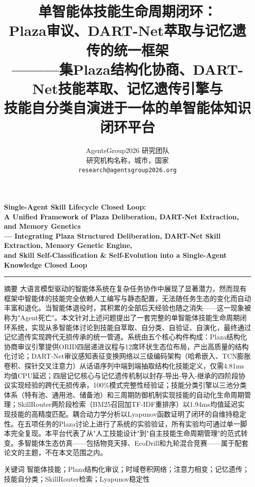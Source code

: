 \documentclass[12pt,a4paper]{ctexart}
\title{\zihao{2}\heiti 单智能体技能生命周期闭环：\\Plaza审议、DART-Net萃取与记忆遗传的统一框架\\
        \vspace{6pt}
        {\zihao{4}\heiti ———集Plaza结构化协商、DART-Net技能萃取、记忆遗传引擎与\\技能自分类自演进于一体的单智能体知识闭环平台}}
\author{
  \zihao{4} AgentsGroup2026 研究团队 \\[4pt]
  \zihao{-5} 研究机构名称，城市，国家 \\[2pt]
  \zihao{-5} \texttt{research@agentsgroup2026.org}
}
\date{}
\begin{document}
\maketitle

\begin{center}
  {\bfseries Single-Agent Skill Lifecycle Closed Loop:\\[2pt]
  A Unified Framework of Plaza Deliberation, DART-Net Extraction, and Memory Genetics\\[4pt]
  \kaishu --- Integrating Plaza Structured Deliberation, DART-Net Skill Extraction, Memory Genetic Engine,\\
  and Skill Self-Classification \& Self-Evolution into a Single-Agent Knowledge Closed Loop}
\end{center}

\vspace{12pt}
\hrule
\vspace{12pt}

{\heiti{} 摘\quad 要\quad}
{\kaishu{}
大语言模型驱动的智能体系统在复杂任务协作中展现了显著潜力，然而现有框架中智能体的技能完全依赖人工编写与静态配置，无法随任务生态的变化而自动丰富和退化。当智能体退役时，其积累的全部后天经验也随之消失——这一现象被称为"Agent死亡"。本文针对上述问题提出了一套完整的单智能体技能生命周期闭环系统，实现从多智能体讨论到技能自萃取、自分类、自验证、自演化，最终通过记忆遗传实现跨代无损传承的统一管道。系统由五个核心构件构成：Plaza结构化协商审议引擎提供ORID四层递进议程与12席环状生态位布局，产出高质量的结构化讨论；DART-Net审议感知表征变换网络以三级编码架构（哈希嵌入、TCN膨胀卷积、探针交叉注意力）从话语序列中端到端抽取结构化技能定义，仅需4.81ms均值CPU延迟；四层记忆核心与记忆遗传机制以封存-导出-导入-继承的四阶段协议实现经验的跨代无损传承，100\%模式完整性经验证；技能分类引擎以三池分类体系（特有池、通用池、储备池）和三周期防御机制实现技能的自动化生命周期管理；SkillRouter两阶段检索（BM25召回加TF-IDF重排序）以1.94ms均值延迟实现技能的高精度匹配。耦合动力学分析以Lyapunov函数证明了闭环的自维持稳定性。在五项任务的Plaza讨论上进行了系统的实验验证，所有实验均可通过单一脚本完全复现。本平台代表了从"人工技能设计"到"自主技能生命周期管理"的范式转变。多智能体生态仿真——包括物竞天择、EcoDrill和九轮混合竞赛——属于配套论文的主题，不在本文范围之内。
}

\vspace{6pt}
{\heiti{} 关键词\quad}{\kaishu{} 智能体技能；Plaza结构化审议；时域卷积网络；注意力相变；记忆遗传；技能自分类；SkillRouter检索；Lyapunov稳定性}
\end{document}
